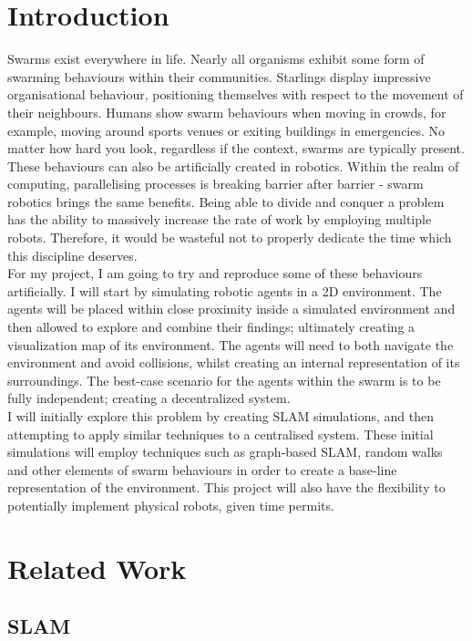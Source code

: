 \documentclass[12pt]{article}
\begin{document}
\section{Introduction}
Swarms exist everywhere in life. Nearly all organisms exhibit some form of swarming behaviours within their
communities. Starlings display impressive organisational behaviour, positioning themselves with respect to the
movement of their neighbours. Humans show swarm behaviours when moving in crowds, for example, moving around sports
venues or exiting buildings in emergencies. No matter how hard you look, regardless if the context, swarms are
typically present.\\
These behaviours can also be artificially created in robotics. Within the realm of computing, parallelising
processes is breaking barrier after barrier - swarm robotics brings the same benefits. Being able to divide and
conquer a problem has the ability to massively increase the rate of work by employing multiple robots. Therefore, it
would be wasteful not to properly dedicate the time which this discipline deserves.\\
For my project, I am going to try and reproduce some of these behaviours artificially. I will start by simulating robotic
agents in a 2D environment. The agents will be placed within close proximity inside a simulated environment and then allowed
to explore and combine their findings; ultimately creating a visualization map of its environment. The agents will need to
both navigate the environment and avoid collisions, whilst creating an internal representation of its surroundings. The
best-case scenario for the agents within the swarm is to be fully independent; creating a decentralized system.\\
I will initially explore this problem by creating SLAM simulations, and then attempting to apply similar techniques
to a centralised system. These initial simulations will employ techniques such as graph-based SLAM, random walks and other elements of
swarm behaviours in order to create a base-line representation of the environment. This project will also have the flexibility to
potentially implement physical robots, given time permits.\\


\section{Related Work}
\subsection{SLAM}
\end{document}
